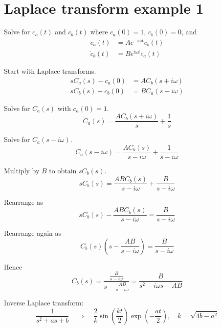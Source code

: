 

\section*{Laplace transform example 1}

Solve for $c_a(t)$ and $c_b(t)$ where $c_a(0)=1$, $c_b(0)=0$, and
\begin{align*}
\dot c_a(t)&=Ae^{-i\omega t}c_b(t)
\\
\dot c_b(t)&=Be^{i\omega t}c_a(t)
\end{align*}

Start with Laplace transforms.
\begin{align*}
sC_a(s)-c_a(0)&=AC_b(s+i\omega)
\\
sC_b(s)-c_b(0)&=BC_a(s-i\omega)
\end{align*}

Solve for $C_a(s)$ with $c_a(0)=1$.
\begin{equation*}
C_a(s)=\frac{AC_b(s+i\omega)}{s}+\frac{1}{s}
\end{equation*}

Solve for $C_a(s-i\omega)$.
\begin{equation*}
C_a(s-i\omega)=\frac{AC_b(s)}{s-i\omega}+\frac{1}{s-i\omega}
\end{equation*}

Multiply by $B$ to obtain $sC_b(s)$.
\begin{equation*}
sC_b(s)=\frac{ABC_b(s)}{s-i\omega}+\frac{B}{s-i\omega}
\end{equation*}

Rearrange as
\begin{equation*}
sC_b(s)-\frac{ABC_b(s)}{s-i\omega}=\frac{B}{s-i\omega}
\end{equation*}

Rearrange again as
\begin{equation*}
C_b(s)\left(s-\frac{AB}{s-i\omega}\right)=\frac{B}{s-i\omega}
\end{equation*}

Hence
\begin{equation*}
C_b(s)=\frac
{\displaystyle\frac{B}{s-i\omega}}
{\displaystyle s-\frac{AB}{s-i\omega}}
=\frac{B}{s^2-i\omega s-AB}
\end{equation*}

Inverse Laplace transform:
\begin{equation*}
\frac{1}{s^2+as+b}\quad\Rightarrow\quad
\frac{2}{k}\sin\left(\frac{kt}{2}\right)\exp\left(-\frac{at}{2}\right),\quad
k=\sqrt{4b-a^2}
\end{equation*}

